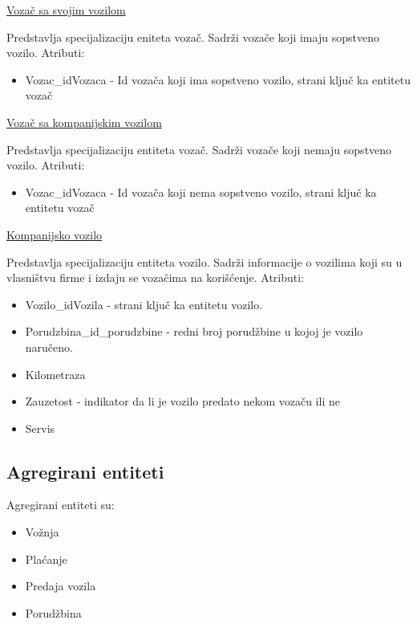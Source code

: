 \begin{flushleft}
\underline{Vozač sa svojim vozilom}
\end{flushleft}
Predstavlja specijalizaciju eniteta vozač. Sadrži vozače koji imaju sopstveno vozilo. Atributi:
\begin{itemize}
    \item Vozac\_idVozaca - Id vozača koji ima sopstveno vozilo, strani ključ ka entitetu vozač
\end{itemize}

\begin{flushleft}
\underline{Vozač sa kompanijskim vozilom}
\end{flushleft}
Predstavlja specijalizaciju entiteta vozač. Sadrži vozače koji nemaju sopstveno vozilo. Atributi:
\begin{itemize}
    \item Vozac\_idVozaca - Id vozača koji nema sopstveno vozilo, strani ključ ka entitetu vozač
\end{itemize}

\begin{flushleft}
\underline{Kompanijsko vozilo}
\end{flushleft}
Predstavlja specijalizaciju entiteta vozilo. Sadrži informacije o vozilima koji su u vlasništvu firme i izdaju se vozačima na korišćenje. Atributi:
\begin{itemize}
    \item Vozilo\_idVozila - strani ključ ka entitetu vozilo.
    \item Porudzbina\_id\_porudzbine - redni broj porudžbine u kojoj je vozilo naručeno.
    \item Kilometraza
    \item Zauzetost - indikator da li je vozilo predato nekom vozaču ili ne
    \item Servis
\end{itemize}


\subsection{\textbf{Agregirani entiteti}}
Agregirani entiteti su:
\begin{itemize}
    \item Vožnja
    \item Plaćanje
    \item Predaja vozila
    \item Porudžbina
\end{itemize}


